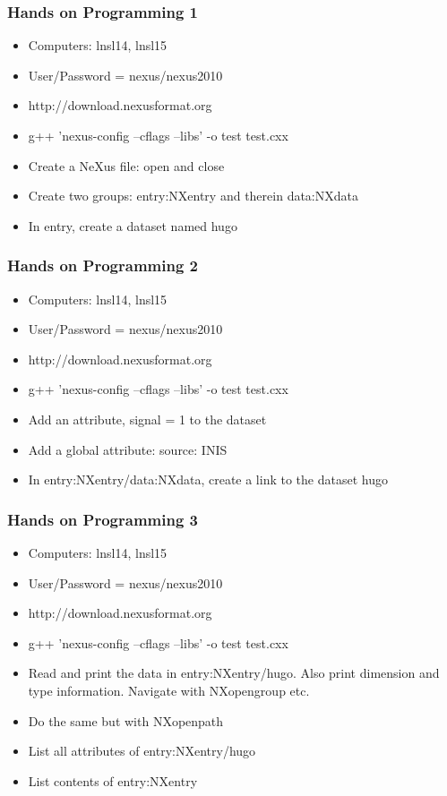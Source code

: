 \documentclass{beamer}
\begin{document}
\begin{frame}
\frametitle{Hands on Programming 1}
\begin{itemize}
\item<1->Computers: lnsl14, lnsl15
\item<1->User/Password = nexus/nexus2010
\item<1->http://download.nexusformat.org
\item<1->g++ 'nexus-config --cflags --libs' -o test test.cxx
\item<2->Create a NeXus file: open and close
\item<3->Create two groups: entry:NXentry and therein data:NXdata
\item<4->In entry, create a dataset named hugo
\end{itemize}
\end{frame}

\begin{frame}
\frametitle{Hands on Programming 2}
\begin{itemize}
\item<1->Computers: lnsl14, lnsl15
\item<1->User/Password = nexus/nexus2010
\item<1->http://download.nexusformat.org
\item<1->g++ 'nexus-config --cflags --libs' -o test test.cxx
\item<2->Add an attribute, signal = 1 to the dataset
\item<3->Add a global attribute: source: INIS
\item<4->In entry:NXentry/data:NXdata, create a link to the dataset hugo
\end{itemize}
\end{frame}

\begin{frame}
\frametitle{Hands on Programming 3}
\begin{itemize}
\item<1->Computers: lnsl14, lnsl15
\item<1->User/Password = nexus/nexus2010
\item<1->http://download.nexusformat.org
\item<1->g++ 'nexus-config --cflags --libs' -o test test.cxx
\item<2->Read and print the data in entry:NXentry/hugo. Also print dimension 
 and type information. Navigate with NXopengroup etc.
\item<3->Do the same but with NXopenpath 
\item<4->List all attributes of entry:NXentry/hugo
\item<5->List contents of entry:NXentry
\end{itemize}
\end{frame}
\end{document}
